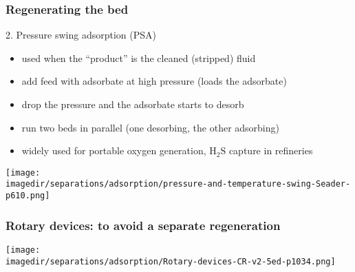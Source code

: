 \begin{frame}\frametitle{Regenerating the bed}
	2.	Pressure swing adsorption (PSA)
	\begin{itemize}
		\item	used when the ``product'' is the cleaned (stripped) fluid
		\item	add feed with adsorbate at high pressure (loads the adsorbate)
		\item	drop the pressure and the adsorbate starts to desorb
		\item	run two beds in parallel (one desorbing, the other adsorbing)
		\item	widely used for portable oxygen generation, $\text{H}_2\text{S}$ capture in refineries
	\end{itemize}
	\begin{center}
		\texttt{[image: \\imagedir/separations/adsorption/pressure-and-temperature-swing-Seader-p610.png]}
	\end{center}
	\vspace{-14pt}
\end{frame}

\begin{frame}\frametitle{Rotary devices: to avoid a separate regeneration}
	\begin{center}
		\texttt{[image: \\imagedir/separations/adsorption/Rotary-devices-CR-v2-5ed-p1034.png]}
	\end{center}
	\vspace{-12pt}
\end{frame}

